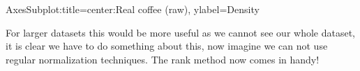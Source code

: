 \documentclass[letterpaper,10pt,english]{jupyterBook}
\begin{document}
\begin{sphinxVerbatim}[commandchars=\\\{\}]
\PYGZlt{}AxesSubplot:title=\PYGZob{}\PYGZsq{}center\PYGZsq{}:\PYGZsq{}Real coffee (raw)\PYGZsq{}\PYGZcb{}, ylabel=\PYGZsq{}Density\PYGZsq{}\PYGZgt{}
\end{sphinxVerbatim}

\noindent{}

\sphinxAtStartPar
For larger datasets this would be more useful as we cannot see our whole dataset, it is clear we have to do something about this, now imagine we can not use regular normalization techniques.
The rank method now comes in handy!

\begin{sphinxVerbatim}[commandchars=\\\{\}]
\PYG{p}{[}\PYG{p}{]}  \PYG{p}{[}\PYG{p}{]}
\end{sphinxVerbatim}
\end{document}
